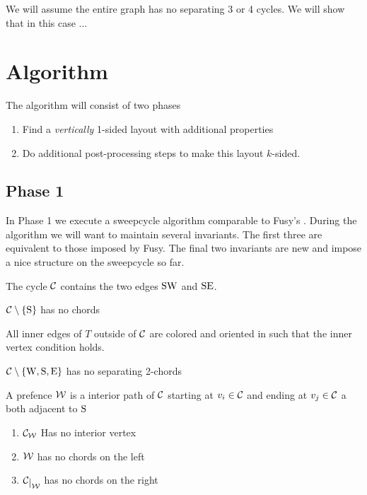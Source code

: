 \renewcommand{\Q}{\scr Q}


We will assume the entire graph has no separating 3 or 4 cycles. We will show that in this case ...



\section{Algorithm}
  The algorithm will consist of two phases

  \begin{enumerate}
    \item Find a \emph{vertically} 1-sided layout with additional properties
    \item Do additional post-processing steps to make this layout $k$-sided.
  \end{enumerate}

\subsection{Phase 1}
  In Phase 1 we execute a sweepcycle algorithm comparable to Fusy's \cite{Fusy2006}.
  During the algorithm we will want to maintain several invariants. The first three are equivalent to those imposed by Fusy. The final two invariants are new and impose a nice structure on the sweepcycle so far.

  \begin{invariants}
    \itemsep=-4pt

    \item \label{i:uni:SWandSE} The cycle $\mathcal{C}$ contains the two edges $\mathrm{S} \mathrm{W}$ and $\mathrm{S} \mathrm{E}$.
    \item \label{i:uni:noChords} $\mathcal{C} \setminus \left\lbrace {\mathrm{S}} \right\rbrace$ has no chords
    \item \label{i:uni:intVertCond} All inner edges of $T$ outside of $\mathcal{C}$ are colored and oriented in such that the inner vertex condition holds. %
    \item \label{i:uni:no2Chords} $\mathcal{C}\setminus \left\lbrace {\mathrm{W}, \mathrm{S}, \mathrm{E}} \right\rbrace$ has no separating 2-chords
  \end{invariants}


  \begin{defi}[Prefence]
  A prefence $\mathcal{W}$ is a interior path of $\mathcal{C}$ starting at $v_i \in \mathcal{C}$ and ending at $v_j \in \mathcal{C}$ a both adjacent to $\mathrm{S}$
  \begin{enumerate}
    \itemsep=-4pt
    \renewcommand*{\labelenumi}{(P\arabic{enumi})}%
    \renewcommand*{\theenumi}{(P\arabic{enumi})}%

    \item  $\mathcal{C}_{\mathcal{W}}$ Has no interior vertex
    \label{p:noInteriorVertex}
    \item  $\mathcal{W}$ has no chords on the left     \label{p:Wchordfree}
    \item  $\restC{\W}$ has no chords on the right     \label{p:Cchordfree}
  \end{enumerate}
  \end{defi}

